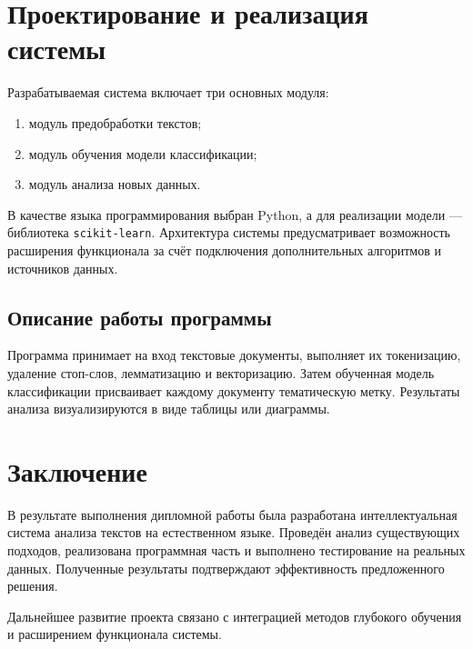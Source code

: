 \documentclass[14pt,a4paper]{extarticle}
\begin{document}
\newpage
\section{Проектирование и реализация системы}
Разрабатываемая система включает три основных модуля:
\begin{enumerate}
    \item модуль предобработки текстов;
    \item модуль обучения модели классификации;
    \item модуль анализа новых данных.
\end{enumerate}

В качестве языка программирования выбран Python, а для реализации модели — библиотека \texttt{scikit-learn}.
Архитектура системы предусматривает возможность расширения функционала за счёт подключения дополнительных алгоритмов и источников данных.

\subsection{Описание работы программы}
Программа принимает на вход текстовые документы, выполняет их токенизацию, удаление стоп-слов, лемматизацию и векторизацию.
Затем обученная модель классификации присваивает каждому документу тематическую метку.
Результаты анализа визуализируются в виде таблицы или диаграммы.

\newpage
\section*{Заключение}
В результате выполнения дипломной работы была разработана интеллектуальная система анализа текстов на естественном языке.
Проведён анализ существующих подходов, реализована программная часть и выполнено тестирование на реальных данных.
Полученные результаты подтверждают эффективность предложенного решения.

Дальнейшее развитие проекта связано с интеграцией методов глубокого обучения и расширением функционала системы.
\end{document}
